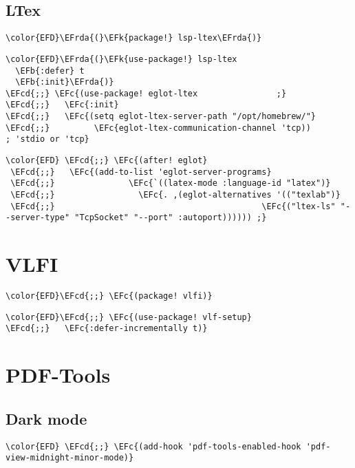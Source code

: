 \documentclass[12pt]{article}
\theoremstyle{plain}%
\theoremstyle{definition}
\theoremstyle{remark}
\newcommand{\EFc}[1]{\textcolor{EFc}{#1}} %
\newcommand{\EFcd}[1]{\textcolor{EFcd}{#1}} %
\newcommand{\EFk}[1]{\textcolor{EFk}{#1}} %
\newcommand{\EFb}[1]{\textcolor{EFb}{#1}} %
\newcommand{\EFrda}[1]{\textcolor{EFrda}{#1}} %
\begin{document}
\subsection{LTex}
\label{sec:orgd90daf8}
\begin{Code}
\begin{Verbatim}
\color{EFD}\EFrda{(}\EFk{package!} lsp-ltex\EFrda{)}
\end{Verbatim}
\end{Code}
\begin{Code}
\begin{Verbatim}
\color{EFD}\EFrda{(}\EFk{use-package!} lsp-ltex
  \EFb{:defer} t
  \EFb{:init}\EFrda{)}
\EFcd{;;} \EFc{(use-package! eglot-ltex                ;}
\EFcd{;;}   \EFc{:init}
\EFcd{;;}   \EFc{(setq eglot-ltex-server-path "/opt/homebrew/"}
\EFcd{;;}         \EFc{eglot-ltex-communication-channel 'tcp))         ; 'stdio or 'tcp}
\end{Verbatim}
\end{Code}
\begin{Code}
\begin{Verbatim}
\color{EFD} \EFcd{;;} \EFc{(after! eglot}
 \EFcd{;;}   \EFc{(add-to-list 'eglot-server-programs}
 \EFcd{;;}               \EFc{`((latex-mode :language-id "latex")}
 \EFcd{;;}                 \EFc{. ,(eglot-alternatives '(("texlab")}
 \EFcd{;;}                                          \EFc{("ltex-ls" "--server-type" "TcpSocket" "--port" :autoport)))))) ;}
\end{Verbatim}
\end{Code}
\section{VLFI}
\label{sec:orgc15e452}
\begin{Code}
\begin{Verbatim}
\color{EFD}\EFcd{;;} \EFc{(package! vlfi)}
\end{Verbatim}
\end{Code}
\begin{Code}
\begin{Verbatim}
\color{EFD}\EFcd{;;} \EFc{(use-package! vlf-setup}
\EFcd{;;}   \EFc{:defer-incrementally t)}
\end{Verbatim}
\end{Code}
\section{PDF-Tools}
\label{sec:orgc77f152}
\subsection{Dark mode}
\label{sec:orgd65ce49}
\begin{Code}
\begin{Verbatim}
\color{EFD} \EFcd{;;} \EFc{(add-hook 'pdf-tools-enabled-hook 'pdf-view-midnight-minor-mode)}
\end{Verbatim}
\end{Code}
\end{document}
